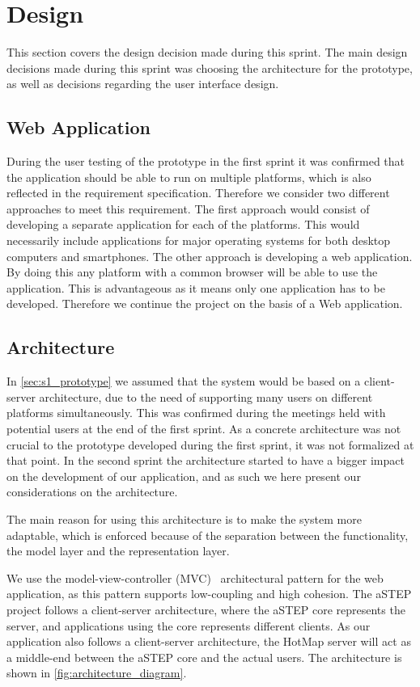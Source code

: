 \section{Design} \label{sec:s2_design}
This section covers the design decision made during this sprint. The main design decisions made during this sprint was choosing the architecture for the prototype, as well as decisions regarding the user interface design.

\subsection{Web Application}
During the user testing of the prototype in the first sprint it was confirmed that the application should be able to run on multiple platforms, which is also reflected in the requirement specification. Therefore we consider two different approaches to meet this requirement. The first approach would consist of developing a separate application for each of the platforms. This would necessarily include applications for major operating systems for both desktop computers and smartphones. The other approach is developing a web application. By doing this any platform with a common browser will be able to use the application. This is advantageous as it means only one application has to be developed. Therefore we continue the project on the basis of a Web application. 

\subsection{Architecture} \label{sec:s2_architecture}
In \cref{sec:s1_prototype} we assumed that the system would be based on a client-server architecture, due to the need of supporting many users on different platforms simultaneously. This was confirmed during the meetings held with potential users at the end of the first sprint. As a concrete architecture was not crucial to the prototype developed during the first sprint, it was not formalized at that point. In the second sprint the architecture started to have a bigger impact on the development of our application, and as such we here present our considerations on the architecture.

The main reason for using this architecture is to make the system more adaptable, which is enforced because of the separation between the functionality, the model layer and the representation layer.

We use the model-view-controller (MVC)~\cite{website:MVC} architectural pattern for the web application, as this pattern supports low-coupling and high cohesion. The aSTEP project follows a client-server architecture, where the aSTEP core represents the server, and applications using the core represents different clients. As our application also follows a client-server architecture, the HotMap server will act as a middle-end between the aSTEP core and the actual users. The architecture is shown in \cref{fig:architecture_diagram}.

